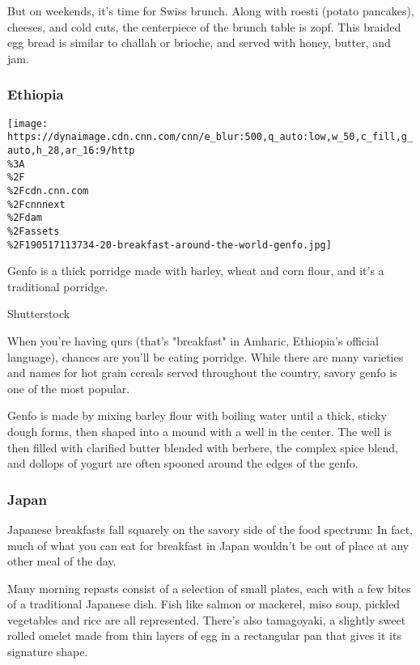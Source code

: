 But on weekends, it's time for Swiss brunch. Along with roesti (potato
pancakes), cheeses, and cold cuts, the centerpiece of the brunch table
is zopf. This braided egg bread is similar to challah or brioche, and
served with honey, butter, and jam.

\hypertarget{ethiopia}{%
\subsubsection{Ethiopia}\label{ethiopia}}

\href{/travel/article/breakfast-food-around-the-world/index.html?gallery=1}{}

\texttt{[image: https://dynaimage.cdn.cnn.com/cnn/e\_blur:500,q\_auto:low,w\_50,c\_fill,g\_auto,h\_28,ar\_16:9/http\\\%3A\\\%2F\\\%2Fcdn.cnn.com\\\%2Fcnnnext\\\%2Fdam\\\%2Fassets\\\%2F190517113734-20-breakfast-around-the-world-genfo.jpg]}

Genfo is a thick porridge made with barley, wheat and corn flour, and
it's a traditional porridge.

Shutterstock

When you're having qurs (that's "breakfast" in Amharic, Ethiopia's
official language), chances are you'll be eating porridge. While there
are many varieties and names for hot grain cereals served throughout the
country, savory genfo is one of the most popular.

Genfo is made by mixing barley flour with boiling water until a thick,
sticky dough forms, then shaped into a mound with a well in the center.
The well is then filled with clarified butter blended with berbere, the
complex spice blend, and dollops of yogurt are often spooned around the
edges of the genfo.

\hypertarget{japan}{%
\subsubsection{Japan}\label{japan}}

Japanese breakfasts fall squarely on the savory side of the food
spectrum: In fact, much of what you can eat for breakfast in Japan
wouldn't be out of place at any other meal of the day.

Many morning repasts consist of a selection of small plates, each with a
few bites of a traditional Japanese dish. Fish like salmon or mackerel,
miso soup, pickled vegetables and rice are all represented. There's also
tamagoyaki, a slightly sweet rolled omelet made from thin layers of egg
in a rectangular pan that gives it its signature shape.

